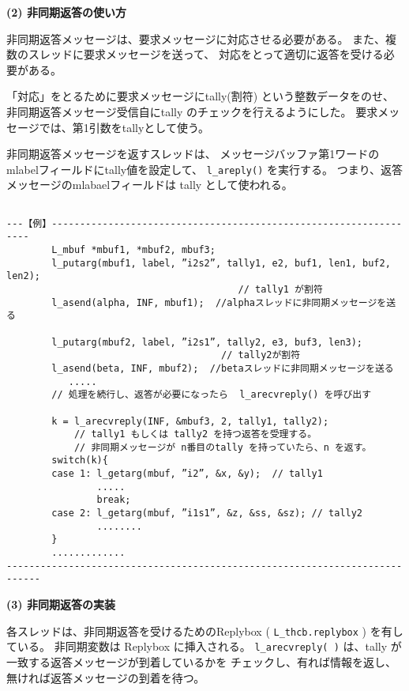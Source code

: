 {\flushleft\bf (2) 非同期返答の使い方}

非同期返答メッセージは、要求メッセージに対応させる必要がある。
また、複数のスレッドに要求メッセージを送って、
対応をとって適切に返答を受ける必要がある。

「対応」をとるために要求メッセージにtally(割符) という整数データをのせ、
非同期返答メッセージ受信自にtally のチェックを行えるようにした。
要求メッセージでは、第1引数をtallyとして使う。

非同期返答メッセージを返すスレッドは、
メッセージバッファ第1ワードのmlabelフィールドにtally値を設定して、
\verb|l_areply()| を実行する。
つまり、返答メッセージのmlabaelフィールドは tally として使われる。


\begin{verbatim}

---【例】------------------------------------------------------------------
        L_mbuf *mbuf1, *mbuf2, mbuf3;
        l_putarg(mbuf1, label, ”i2s2”, tally1, e2, buf1, len1, buf2, len2);
                                         // tally1 が割符
        l_asend(alpha, INF, mbuf1);  //alphaスレッドに非同期メッセージを送る

        l_putarg(mbuf2, label, ”i2s1”, tally2, e3, buf3, len3);
                                      // tally2が割符
        l_asend(beta, INF, mbuf2);  //betaスレッドに非同期メッセージを送る
           .....
        // 処理を続行し、返答が必要になったら  l_arecvreply() を呼び出す

        k = l_arecvreply(INF, &mbuf3, 2, tally1, tally2);
            // tally1 もしくは tally2 を持つ返答を受理する。
            // 非同期メッセージが n番目のtally を持っていたら、n を返す。
        switch(k){
        case 1: l_getarg(mbuf, ”i2”, &x, &y);  // tally1 
                .....
                break;
        case 2: l_getarg(mbuf, ”i1s1”, &z, &ss, &sz); // tally2
                ........
        }
        .............
----------------------------------------------------------------------------
\end{verbatim}


{\flushleft\bf (3) 非同期返答の実装}

各スレッドは、非同期返答を受けるためのReplybox ( \verb|L_thcb.replybox| )
を有している。
非同期変数は Replybox に挿入される。
\verb|l_arecvreply( )| は、tally が一致する返答メッセージが到着しているかを
チェックし、有れば情報を返し、無ければ返答メッセージの到着を待つ。


